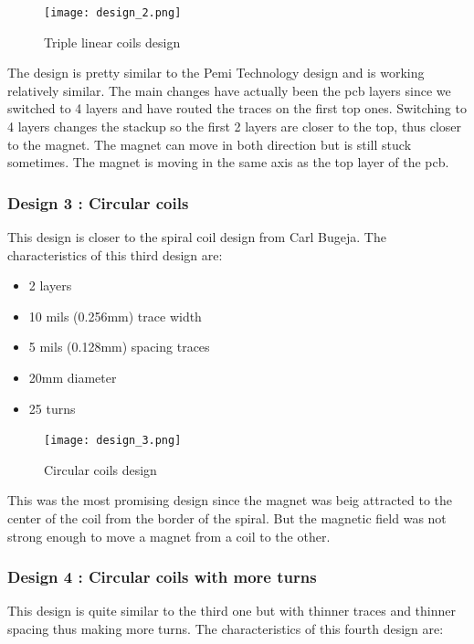 \begin{figure}[H]
	\centering
	\texttt{[image: design\_2.png]}
	\caption[Triple linear coils design]{Triple linear coils design}
	\label{fig:triple_linear}
\end{figure}

The design is pretty similar to the Pemi Technology design and is working relatively similar. The main changes have actually been the \gls{pcb} layers since we switched to 4 layers and have routed the traces on the first top ones. Switching to 4 layers changes the stackup so the first 2 layers are closer to the top, thus closer to the magnet. The magnet can move in both direction but is still stuck sometimes. The magnet is moving in the same axis as the top layer of the \gls{pcb}.

\newpage

\subsubsection{Design 3 : Circular coils}

This design is closer to the spiral coil design from Carl Bugeja. The characteristics of this third design are:

\begin{itemize}
	\item 2 layers
	\item 10 mils (0.256mm) trace width
	\item 5 mils (0.128mm) spacing traces
	\item 20mm diameter
	\item 25 turns
\end{itemize}

\begin{figure}[H]
	\centering
	\texttt{[image: design\_3.png]}
	\caption[Circular coils design]{Circular coils design}
	\label{fig:circular}
\end{figure}

This was the most promising design since the magnet was beig attracted to the center of the coil from the border of the spiral. But the magnetic field was not strong enough to move a magnet from a coil to the other.

\newpage


\subsubsection{Design 4 : Circular coils with more turns}

This design is quite similar to the third one but with thinner traces and thinner spacing thus making more turns. The characteristics of this fourth design are:

